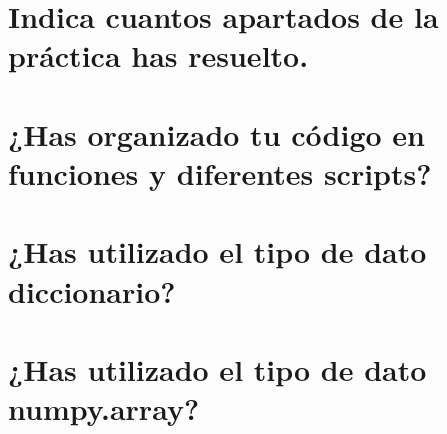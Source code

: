 \section{Indica cuantos apartados de la práctica has resuelto.}
\section{¿Has organizado tu código en funciones y diferentes scripts?}
\section{¿Has utilizado el tipo de dato diccionario?}
\section{¿Has utilizado el tipo de dato numpy.array?}
